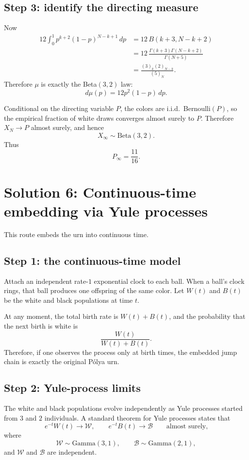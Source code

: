 \documentclass[12pt]{article}
\begin{document}
\subsection*{Step 3: identify the directing measure}
Now
\begin{align*}
12\int_0^1 p^{k+2}(1-p)^{N-k+1}\,dp
&=
12\,B(k+3,N-k+2) \\
&=
12\,\frac{\Gamma(k+3)\Gamma(N-k+2)}{\Gamma(N+5)} \\
&=
\frac{(3)_k(2)_{N-k}}{(5)_N}.
\end{align*}
Therefore $\mu$ is exactly the Beta$(3,2)$ law:
\[
d\mu(p)=12p^2(1-p)\,dp.
\]

Conditional on the directing variable $P$, the colors are i.i.d.\ Bernoulli$(P)$, so the empirical fraction of white draws converges almost surely to $P$. Therefore $X_N\to P$ almost surely, and hence
\[
X_\infty\sim \mathrm{Beta}(3,2).
\]
Thus
\[
P_\infty=\frac{11}{16}.
\]

\section{Solution 6: Continuous-time embedding via Yule processes}

This route embeds the urn into continuous time.

\subsection*{Step 1: the continuous-time model}
Attach an independent rate-$1$ exponential clock to each ball. When a ball's clock rings, that ball produces one offspring of the same color. Let $W(t)$ and $B(t)$ be the white and black populations at time $t$.

At any moment, the total birth rate is $W(t)+B(t)$, and the probability that the next birth is white is
\[
\frac{W(t)}{W(t)+B(t)}.
\]
Therefore, if one observes the process only at birth times, the embedded jump chain is exactly the original P\'olya urn.

\subsection*{Step 2: Yule-process limits}
The white and black populations evolve independently as Yule processes started from $3$ and $2$ individuals. A standard theorem for Yule processes states that
\[
e^{-t}W(t)\longrightarrow \mathcal{W},
\qquad
e^{-t}B(t)\longrightarrow \mathcal{B}
\qquad\text{almost surely,}
\]
where
\[
\mathcal{W}\sim \mathrm{Gamma}(3,1),
\qquad
\mathcal{B}\sim \mathrm{Gamma}(2,1),
\]
and $\mathcal{W}$ and $\mathcal{B}$ are independent.
\end{document}
